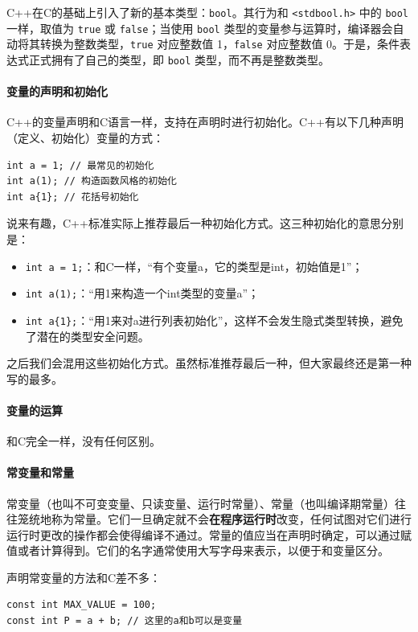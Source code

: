 C++在C的基础上引入了新的基本类型：\verb|bool|。其行为和 \verb|<stdbool.h>| 中的 \verb|bool| 一样，取值为 \verb|true| 或 \verb|false|；当使用 \verb|bool| 类型的变量参与运算时，编译器会自动将其转换为整数类型，\verb|true| 对应整数值 1，\verb|false| 对应整数值 0。于是，条件表达式正式拥有了自己的类型，即 \verb|bool| 类型，而不再是整数类型。

\paragraph{变量的声明和初始化}

C++的变量声明和C语言一样，支持在声明时进行初始化。C++有以下几种声明（定义、初始化）变量的方式：
\begin{verbatim}
int a = 1; // 最常见的初始化
int a(1); // 构造函数风格的初始化
int a{1}; // 花括号初始化
\end{verbatim}
说来有趣，C++标准实际上推荐最后一种初始化方式。这三种初始化的意思分别是：
\begin{itemize}
        \item \verb|int a = 1;|：和C一样，“有个变量a，它的类型是int，初始值是1”；
        \item \verb|int a(1);|：“用1来构造一个int类型的变量a”；
        \item \verb|int a{1};|：“用1来对a进行列表初始化”，这样不会发生隐式类型转换，避免了潜在的类型安全问题。
\end{itemize}
之后我们会混用这些初始化方式。虽然标准推荐最后一种，但大家最终还是第一种写的最多。

\paragraph{变量的运算} 和C完全一样，没有任何区别。

\paragraph{常变量和常量} 常变量（也叫不可变变量、只读变量、运行时常量）、常量（也叫编译期常量）往往笼统地称为常量。它们一旦确定就不会\textbf{在程序运行时}改变，任何试图对它们进行运行时更改的操作都会使得编译不通过。常量的值应当在声明时确定，可以通过赋值或者计算得到。它们的名字通常使用大写字母来表示，以便于和变量区分。

声明常变量的方法和C差不多：
\begin{verbatim}
const int MAX_VALUE = 100;
const int P = a + b; // 这里的a和b可以是变量
\end{verbatim}

